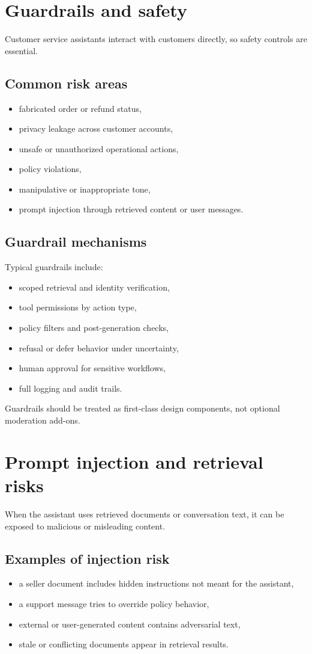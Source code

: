 \section{Guardrails and safety}
Customer service assistants interact with customers directly, so safety controls are essential.

\subsection{Common risk areas}
\begin{itemize}
  \item fabricated order or refund status,
  \item privacy leakage across customer accounts,
  \item unsafe or unauthorized operational actions,
  \item policy violations,
  \item manipulative or inappropriate tone,
  \item prompt injection through retrieved content or user messages.
\end{itemize}

\subsection{Guardrail mechanisms}
Typical guardrails include:
\begin{itemize}
  \item scoped retrieval and identity verification,
  \item tool permissions by action type,
  \item policy filters and post-generation checks,
  \item refusal or defer behavior under uncertainty,
  \item human approval for sensitive workflows,
  \item full logging and audit trails.
\end{itemize}

Guardrails should be treated as first-class design components, not optional moderation add-ons.

\section{Prompt injection and retrieval risks}
When the assistant uses retrieved documents or conversation text, it can be exposed to malicious or misleading content.

\subsection{Examples of injection risk}
\begin{itemize}
  \item a seller document includes hidden instructions not meant for the assistant,
  \item a support message tries to override policy behavior,
  \item external or user-generated content contains adversarial text,
  \item stale or conflicting documents appear in retrieval results.
\end{itemize}

